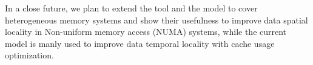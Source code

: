 \documentclass[twoside,twocolumn,8pt]{extarticle}
\begin{document}
In a close future, we plan to extend the tool and the model to cover heterogeneous memory systems and show their usefulness to
improve data spatial locality in Non-uniform memory access (NUMA) systems, while the current model is manly used to improve data
temporal locality with cache usage optimization.



\end{document}
